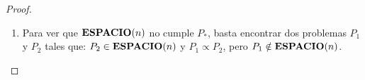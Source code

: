 \begin{ejercicio}
\begin{proof}
\begin{enumerate}
\begin{enumerate}
                Por lo tanto, el tiempo total de $\ALG_1$ es la suma del tiempo en calcular REDU$(x)$, que por el Lema
                \ref{lema:tpol} es de orden polinómico, y el tiempo para ejecutar 
                $\ALG_2(\REDU(x))$, que, como acabamos de ver, es también de orden polinómico.
            \end{enumerate}
            
            Tenemos entonces que $\ALG_1$ es un algoritmo no determinista que decide correctamente
            $P_1$ en tiempo polinómico. Luego $P_1 \in \NP$. De la arbitrariedad de $P_1$ y $P_2$ 
            con $P_2 \in \NP$ y $P_1 \propto P_2$, se deduce que \NP {} $P_*$.

            \item Para ver que $\textbf{ESPACIO}(n)$ no cumple $P_{*}$, basta encontrar dos problemas $P_1$ y $P_2$ tales que:
            $P_2 \in \textbf{ESPACIO}(n)$ y $P_1 \propto P_2$, pero $P_1 \notin \textbf{ESPACIO}(n)$. \\


\end{enumerate}
\end{proof}
\end{ejercicio}
